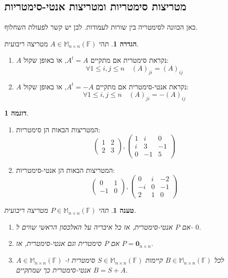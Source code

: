 \documentclass[12pt]{report}
\theoremstyle{plain}
\newtheorem{proposition}[theorem]{טענה}
\theoremstyle{definition}
\newtheorem{definition}[theorem]{הגדרה}
\newtheorem{example}{דוגמה}[chapter]
\newcommand{\F}{\mathbb{F}}
\newcommand{\M}{\mathbb{M}}
\newcommand{\0}{\mathbf{0}}
\begin{document}
\subsection{מטריצות סימטריות ומטריצות אנטי-סימטריות}

כאן הכוונה לסימטריה בין שורות לעמודות. לכן יש קשר לפעולת השחלוף.

\begin{definition}
תהי 
$A\in\M_{n\times n}(\F)$
מטריצה ריבועית.
\begin{enumerate}[label=\alph*.]
\item
$A$
נקראת סימטרית אם מתקיים
$A^t=A$,
או באופן שקול:
$$
\forall 1\leq i,j\leq n \quad (A)_{ji}=(A)_{ij}
$$


\item 
$A$
נקראת אנטי-סימטרית אם מתקיים
$A^t=-A$,
או באופן שקול:
$$
\forall 1\leq i,j\leq n \quad (A)_{ji}=-(A)_{ij}
$$

\end{enumerate}
\end{definition}

\begin{example}\
\begin{enumerate}[label=\alph*.]
\item
המטריצות הבאות הן סימטריות:
$$
\begin{pmatrix}
1 &2\\
2 &3
\end{pmatrix}, \begin{pmatrix}
1 &i &0\\
i &3 &-1  \\
0 &-1 &5
\end{pmatrix}
$$


\item
המטריצות הבאות הן אנטי-סימטריות:
$$
\begin{pmatrix}
0 &1\\
-1 &0
\end{pmatrix}, \begin{pmatrix}
0 &i &-2\\
-i &0 &-1  \\
2 &1 &0
\end{pmatrix}
$$


\end{enumerate}
\end{example}

\begin{proposition}\label{prop:sym-antisym}
תהי
$P\in\M_{n\times n}(\F)$
מטריצה ריבועית.
\begin{enumerate}[label=\alph*.]
\item
אם
$P$
אנטי-סימטרית, אז כל איבריה על האלכסון הראשי שווים ל-
$0$.


\item 
אם
$P$
סימטרית וגם אנטי-סימטרית, אז
$P=\0_{n\times n}$.


\item 
לכל
$B\in\M_{n\times n}(\F)$
קיימות
$S\in\M_{n\times n}(\F)$
סימטרית ו-
$A\in\M_{n\times n}(\F)$
אנטי-סימטרית כך שמתקיים
$B=S+A$.


\end{enumerate}
\end{proposition}
\end{document}
